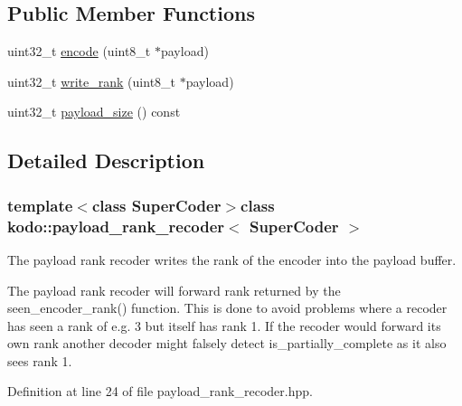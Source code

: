 \subsection*{Public Member Functions}
\begin{DoxyCompactItemize}
\item 
uint32\-\_\-t \hyperlink{classkodo_1_1payload__rank__recoder_a704630609ec502781425400c4eceb690}{encode} (uint8\-\_\-t $\ast$payload)
\begin{DoxyCompactList}\small\item\em \end{DoxyCompactList}\item 
uint32\-\_\-t \hyperlink{classkodo_1_1payload__rank__recoder_ac57ba846d993631fb4c50a6b2562caac}{write\-\_\-rank} (uint8\-\_\-t $\ast$payload)
\item 
uint32\-\_\-t \hyperlink{classkodo_1_1payload__rank__recoder_ab0f64eb2e5479e3fab2ba69b4b594dd7}{payload\-\_\-size} () const 
\begin{DoxyCompactList}\small\item\em \end{DoxyCompactList}\end{DoxyCompactItemize}


\subsection{Detailed Description}
\subsubsection*{template$<$class Super\-Coder$>$class kodo\-::payload\-\_\-rank\-\_\-recoder$<$ Super\-Coder $>$}

The payload rank recoder writes the rank of the encoder into the payload buffer. 

The payload rank recoder will forward rank returned by the seen\-\_\-encoder\-\_\-rank() function. This is done to avoid problems where a recoder has seen a rank of e.\-g. 3 but itself has rank 1. If the recoder would forward its own rank another decoder might falsely detect is\-\_\-partially\-\_\-complete as it also sees rank 1. 

Definition at line 24 of file payload\-\_\-rank\-\_\-recoder.\-hpp.



